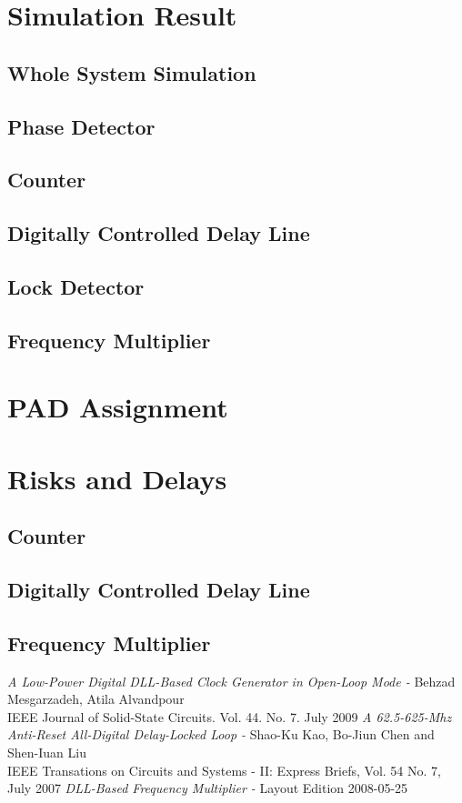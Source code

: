 \documentclass[a4paper,12pt]{article} \usepackage{graphicx}
\begin{document}
\section{Simulation Result}
\subsection{Whole System Simulation}
\subsection{Phase Detector}
\subsection{Counter}
\subsection{Digitally Controlled Delay Line}
\subsection{Lock Detector}
\subsection{Frequency Multiplier}
\section{PAD Assignment} %
\section{Risks and Delays}
\subsection{Counter}
\subsection{Digitally Controlled Delay Line}
\subsection{Frequency Multiplier}
\newpage 
\appendix 
\newpage

\begin{thebibliography}{99}
        \textit{A Low-Power Digital DLL-Based Clock Generator in Open-Loop Mode - }
                Behzad Mesgarzadeh, Atila Alvandpour \\
                IEEE Journal of Solid-State Circuits. Vol. 44. No. 7. July 2009
        \textit{A 62.5-625-Mhz Anti-Reset All-Digital Delay-Locked Loop - }
                Shao-Ku Kao, Bo-Jiun Chen and Shen-Iuan Liu \\
                IEEE Transations on Circuits and Systems - II: Express Briefs, Vol. 54 No. 7, July 2007
        \textit{DLL-Based Frequency Multiplier - }
                Layout Edition 2008-05-25 

\end{thebibliography}
\end{document}
